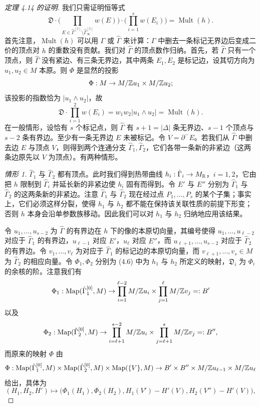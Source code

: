 \begin{proof}[定理 4.14 的证明]我们只需证明恒等式
\begin{equation}
\mathfrak{D}\cdot\Big(\prod_{E\in\hat\Gamma^{[1]}\setminus\hat\Gamma^{[1]}_\infty}w(E)\Big)\cdot\Big(\prod_{i=1}^sw(E_i)\Big)=\operatorname{Mult}(h).
\tag{4.14}
\end{equation}
首先注意，$\operatorname{Mult}(h)$ 可以用 $\Gamma$ 或 $\hat\Gamma$ 来计算：$\Gamma$ 中删去一条标记无界边后变成二价的顶点对 $h$ 的重数没有贡献。我们对 $\hat\Gamma$ 的顶点数作归纳。首先，若 $\hat\Gamma$ 只有一个顶点，则 $\hat\Gamma$ 没有紧边、有三条无界边，其中两条 $E_1,E_2$ 是标记边，设其切方向为 $u_1,u_2\in M$ 本原。则 $\Phi$ 是显然的投影
\[
\Phi:M\to M/\mathbb{Z} u_1\times M/\mathbb{Z} u_2;
\]
该投影的指数恰为 $|u_1\wedge u_2|$，故
\[
\mathfrak{D}\cdot\prod_{i=1}^2w(E_i)=w_1w_2|u_1\wedge u_2|=\operatorname{Mult}(h).
\]
在一般情形，设恰有 $s$ 个标记点，则 $\hat\Gamma$ 有 $s+1=|\Delta|$ 条无界边、$s-1$ 个顶点与 $s-2$ 条有界边。至少有一条无界边 $E$ 未被标记。令 $V=\partial^-E$。若我们从 $\hat\Gamma$ 中删去边 $E$ 与顶点 $V$，则得到两个连通分支 $\hat\Gamma_1,\hat\Gamma_2$，它们各带一条新的非紧边（这两条边原先以 $V$ 为顶点）。有两种情形。

\emph{情形 1.} $\hat\Gamma_1$ 与 $\hat\Gamma_2$ 都有顶点。此时我们得到热带曲线 $h_i:\hat\Gamma_i\to M_{\mathbb{R}}$，$i=1,2$，它由把 $h$ 限制到 $\hat\Gamma_i$ 并延长新的非紧边使 $h_i$ 固有而得到。令 $E'$ 与 $E''$ 分别为 $\hat\Gamma_1$ 与 $\hat\Gamma_2$ 的这两条新的非紧边。注意 $\hat\Gamma_1$ 与 $\hat\Gamma_2$ 现在经过点 $P_1,\dots,P_s$ 的某个子集；事实上，它们必须这样分裂，使得 $h_1$ 与 $h_2$ 都不能在保持该关联性质的前提下形变；否则 $h$ 本身会沿单参数族移动。因此我们可以对 $h_1$ 与 $h_2$ 归纳地应用该结果。

令 $u_1,\dots,u_{s-2}$ 为 $\hat\Gamma$ 的有界边在 $h$ 下的像的本原切向量，其编号使得 $u_1,\dots,u_{\ell-2}$ 对应于 $\hat\Gamma_1$ 的有界边，$u_{\ell-1}$ 对应 $E'$，$u_\ell$ 对应 $E''$，而 $u_{\ell+1},\dots,u_{s-2}$ 对应于 $\hat\Gamma_2$ 的有界边。令 $v_1,\dots,v_\ell$ 为对应于 $\hat\Gamma_1$ 的标记边的本原切向量，而 $v_{\ell+1},\dots,v_s\in M$ 为 $\hat\Gamma_2$ 的相应向量。令 $\Phi_1,\Phi_2$ 分别为 (4.6) 中为 $h_1$ 与 $h_2$ 所定义的映射，$\mathfrak{D}_i$ 为 $\Phi_i$ 的余核的阶。注意我们有
\[
\Phi_1:\operatorname{Map}(\hat\Gamma_1^{[0]},M)\to\prod_{i=1}^{\ell-2}M/\mathbb{Z} u_i\times\prod_{j=1}^\ell M/\mathbb{Z} v_j=:B'
\]
以及
\[
\Phi_2:\operatorname{Map}(\hat\Gamma_2^{[0]},M)\to\prod_{i=\ell+1}^{s-2}M/\mathbb{Z} u_i\times\prod_{j=\ell+1}^sM/\mathbb{Z} v_j=:B'',
\]
而原来的映射 $\Phi$ 由
\[
\Phi:\operatorname{Map}(\hat\Gamma_1^{[0]},M)\times\operatorname{Map}(\hat\Gamma_2^{[0]},M)\times\operatorname{Map}(\{V\},M)\to B'\times B''\times M/\mathbb{Z} u_{\ell-1}\times M/\mathbb{Z} u_\ell
\]
给出，具体为
\[
(H_1,H_2,H')\mapsto\big(\Phi_1(H_1),\Phi_2(H_2),H_1(V')-H'(V),H_2(V'')-H'(V)\big),
\]


\end{proof}
